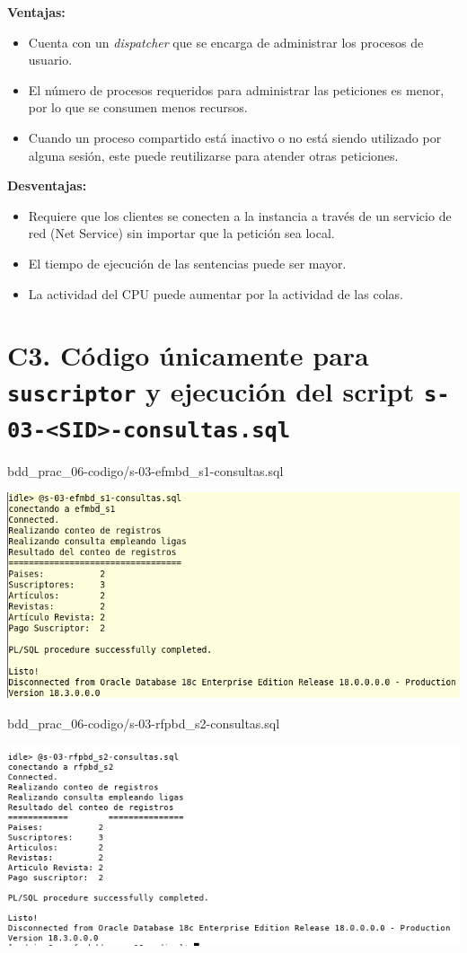 \documentclass{article}
\newcommand{\codedir}{bdd_prac_06-codigo}
\begin{document}
\textbf{Ventajas:}
\begin{itemize}
    \item Cuenta con un \textit{dispatcher} que se encarga de administrar 
      los procesos de usuario.
    \item El número de procesos requeridos para administrar las peticiones es menor, 
      por lo que se consumen menos recursos.
    \item Cuando un proceso compartido está inactivo o no está siendo utilizado 
    por alguna sesión, este puede reutilizarse para atender otras peticiones. \\
\end{itemize} 

\textbf{Desventajas:}
\begin{itemize}
    \item Requiere que los clientes se conecten a la instancia a través de un 
      servicio de red (Net Service) sin importar que la petición sea local.
    \item El tiempo de ejecución de las sentencias puede ser mayor.
    \item La actividad del CPU puede aumentar por la actividad de las colas.
\end{itemize}

\section*{C3. Código únicamente para \texttt{suscriptor} y ejecución del 
  script \texttt{s-03-<SID>-consultas.sql}}


  {\codedir/s-03-efmbd_s1-consultas.sql}

  \includegraphics[width=0.8\linewidth]{efm_c3}


  {\codedir/s-03-rfpbd_s2-consultas.sql}

  \includegraphics[width=0.8\linewidth]{rfp_c3}
\end{document}
